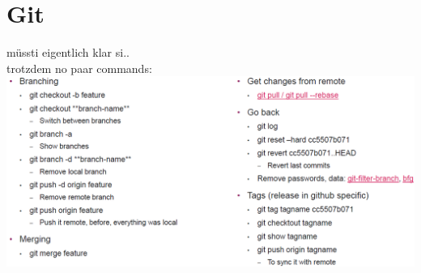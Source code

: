 
\columnbreak
\section{Git}
müssti eigentlich klar si..\\
trotzdem no paar commands:\\
\includegraphics[width=\linewidth]{img/git.png}